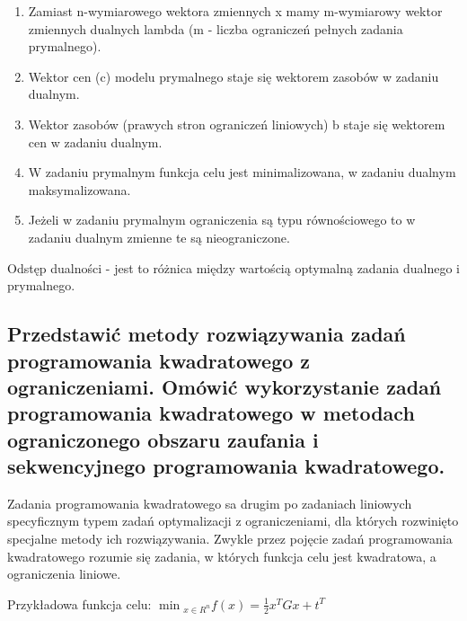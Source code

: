 \begin{enumerate}
    \item Zamiast n-wymiarowego wektora zmiennych x mamy m-wymiarowy wektor zmiennych dualnych lambda (m - liczba ograniczeń pełnych zadania prymalnego).
    \item Wektor cen (c) modelu prymalnego staje się wektorem zasobów w zadaniu dualnym.
    \item Wektor zasobów (prawych stron ograniczeń liniowych) b staje się wektorem cen w zadaniu dualnym.
    \item W zadaniu prymalnym funkcja celu jest minimalizowana, w zadaniu dualnym maksymalizowana.
    \item Jeżeli w zadaniu prymalnym ograniczenia są typu równościowego to w zadaniu dualnym zmienne te są nieograniczone.
\end{enumerate}

Odstęp dualności - jest to różnica między wartością optymalną zadania dualnego i prymalnego.

\subsection{Przedstawić metody rozwiązywania zadań programowania kwadratowego z ograniczeniami. Omówić wykorzystanie zadań programowania kwadratowego w metodach ograniczonego obszaru zaufania i sekwencyjnego programowania kwadratowego.}

Zadania programowania kwadratowego sa drugim po zadaniach liniowych specyficznym typem zadań optymalizacji z ograniczeniami, dla których rozwinięto specjalne metody ich rozwiązywania. Zwykle przez pojęcie zadań programowania kwadratowego rozumie się zadania, w których funkcja celu jest kwadratowa, a ograniczenia liniowe.

Przykładowa funkcja celu: $\min{}_{x\in R^n} f(x) = \frac{1}{2}x^TGx+t^T$

